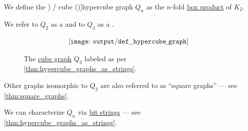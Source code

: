 \begin{definition}\label{def:hypercube_graph}
  We define the \term[en=hypercube (\cite[example 10.2.8]{Rosen2019DiscreteMathematics}) / cube (\cite[def. 4.3.4]{Knauer2019AlgebraicGraphTheory})]{hypercube graph} \( Q_n \) as the \( n \)-fold \hyperref[def:graph_box_product]{box product} of \( K_2 \).

  We refer to \( Q_2 \) as a  and to \( Q_3 \) as a .

  \begin{figure}[!ht]
    \begin{equation}\label{eq:fig:def:hypercube_graph/q3}
      \begin{aligned}
        \texttt{[image: output/def\_\_hypercube\_graph]}
      \end{aligned}
    \end{equation}
    \caption{The \hyperref[def:hypercube_graph]{cube graph} \( Q_3 \) labeled as per \cref{thm:hypercube_graphs_as_strings}.}\label{fig:def:hypercube_graph/q3}
  \end{figure}
\end{definition}
\begin{comments}
  \item Other graphs isomorphic to \( Q_2 \) are also referred to as \enquote{square graphs} --- see \cref{thm:square_graphs}.
  \item We can characterize \( Q_n \) via \hyperref[def:bit_string]{bit strings} --- see \cref{thm:hypercube_graphs_as_strings}.
\end{comments}


